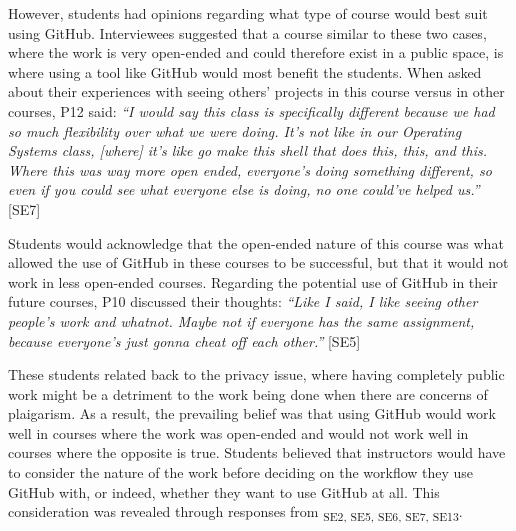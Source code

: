 However, students had opinions regarding what type of course would best suit using GitHub. Interviewees suggested that a course similar to these two cases, where the work is very open-ended and could therefore exist in a public space, is where using a tool like GitHub would most benefit the students. When asked about their experiences with seeing others' projects in this course versus in other courses, P12 said: \textit{``I would say this class is specifically different because we had so much flexibility over what we were doing. It's not like in our Operating Systems class, [where] it's like go make this shell that does this, this, and this. Where this was way more open ended, everyone's doing something different, so even if you could see what everyone else is doing, no one could've helped us.''} [SE7]

Students would acknowledge that the open-ended nature of this course was what allowed the use of GitHub in these courses to be successful, but that it would not work in less open-ended courses. Regarding the potential use of GitHub in their future courses, P10 discussed their thoughts: \textit{``Like I said, I like seeing other people's work and whatnot. Maybe not if everyone has the same assignment, because everyone's just gonna cheat off each other.''} [SE5]



These students related back to the privacy issue, where having completely public work might be a detriment to the work being done when there are concerns of plaigarism. As a result, the prevailing belief was that using GitHub would work well in courses where the work was open-ended and would not work well in courses where the opposite is true. Students believed that instructors would have to consider the nature of the work before deciding on the workflow they use GitHub with, or indeed, whether they want to use GitHub at all. This consideration was revealed through responses from \textsubscript{SE2, SE5, SE6, SE7, SE13}.

